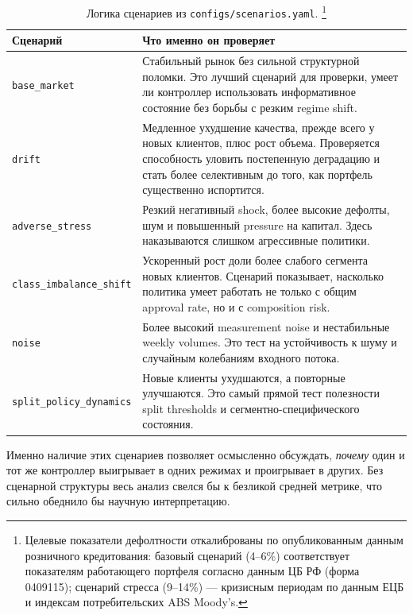 \documentclass[12pt,a4paper]{article}
\begin{document}
\begin{table}[H]
    \centering
    \small
    \begin{tabularx}{0.98\textwidth}{p{}X}
        \toprule
        Сценарий & Что именно он проверяет \\
        \midrule
        \texttt{base\_market} & Стабильный рынок без сильной структурной поломки. Это лучший сценарий для проверки, умеет ли контроллер использовать информативное состояние без борьбы с резким regime shift. \\
        \texttt{drift} & Медленное ухудшение качества, прежде всего у новых клиентов, плюс рост объема. Проверяется способность уловить постепенную деградацию и стать более селективным до того, как портфель существенно испортится. \\
        \texttt{adverse\_stress} & Резкий негативный shock, более высокие дефолты, шум и повышенный pressure на капитал. Здесь наказываются слишком агрессивные политики. \\
        \texttt{class\_imbalance\_shift} & Ускоренный рост доли более слабого сегмента новых клиентов. Сценарий показывает, насколько политика умеет работать не только с общим approval rate, но и с composition risk. \\
        \texttt{noise} & Более высокий measurement noise и нестабильные weekly volumes. Это тест на устойчивость к шуму и случайным колебаниям входного потока. \\
        \texttt{split\_policy\_dynamics} & Новые клиенты ухудшаются, а повторные улучшаются. Это самый прямой тест полезности split thresholds и сегментно-специфического состояния. \\
        \bottomrule
    \end{tabularx}
    \caption{Логика сценариев из \texttt{configs/scenarios.yaml}.%
    \protect\footnote{Целевые показатели дефолтности откалиброваны по опубликованным
    данным розничного кредитования: базовый сценарий (4--6\%) соответствует
    показателям работающего портфеля согласно данным ЦБ РФ (форма 0409115);
    сценарий стресса (9--14\%) --- кризисным периодам по данным ЕЦБ и
    индексам потребительских ABS Moody's.}}
    \label{tab:ru-scenarios}
\end{table}

Именно наличие этих сценариев позволяет осмысленно обсуждать, \emph{почему} один и тот же контроллер выигрывает в одних режимах и проигрывает в других. Без сценарной структуры весь анализ свелся бы к безликой средней метрике, что сильно обеднило бы научную интерпретацию.
\end{document}
